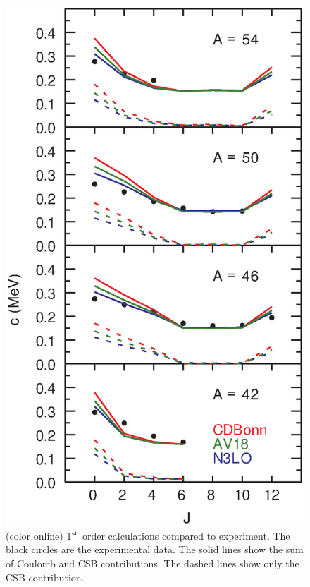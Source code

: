 \documentclass[
10pt,
showpacs,preprintnumbers,footinbib,
amsmath,amssymb,
aps,
prl,twocolumn,groupedaddress,superscriptaddress,
showkeys
]{revtex4-1}
\begin{document}
\begin{figure}
\includegraphics[scale=0.35]{c1.eps}
\caption{(color online) 1$^{\rm st}$ order calculations compared to
experiment. The black circles
are the experimental data. The solid lines show the sum of Coulomb and
CSB
contributions. The dashed lines show only the CSB contribution.}
\end{figure}
\end{document}
